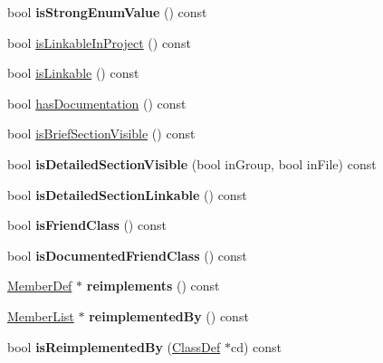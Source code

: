 \begin{DoxyCompactItemize}
\item 
\hypertarget{class_member_def_af5e60e030027845efcf00ce2d73c0cb7}{bool {\bfseries is\-Strong\-Enum\-Value} () const }\label{class_member_def_af5e60e030027845efcf00ce2d73c0cb7}

\item 
bool \hyperlink{class_member_def_a7ff00a84da6e47f3c64c6bf9f6316385}{is\-Linkable\-In\-Project} () const 
\item 
bool \hyperlink{class_member_def_afb5645c0dc69c2f1da67da6e33316e3b}{is\-Linkable} () const 
\item 
bool \hyperlink{class_member_def_a585dcd381ab70014568db8ad457fc8b1}{has\-Documentation} () const 
\item 
bool \hyperlink{class_member_def_adbe69a2ff48ebe408bf56d8f01509942}{is\-Brief\-Section\-Visible} () const 
\item 
\hypertarget{class_member_def_ad7baff8b9ee4a2857d147d23a2c89c86}{bool {\bfseries is\-Detailed\-Section\-Visible} (bool in\-Group, bool in\-File) const }\label{class_member_def_ad7baff8b9ee4a2857d147d23a2c89c86}

\item 
\hypertarget{class_member_def_a0babea827533bcaf56f976fc59504bf9}{bool {\bfseries is\-Detailed\-Section\-Linkable} () const }\label{class_member_def_a0babea827533bcaf56f976fc59504bf9}

\item 
\hypertarget{class_member_def_a113cd56379fd1fcc70708f95e2ffbb73}{bool {\bfseries is\-Friend\-Class} () const }\label{class_member_def_a113cd56379fd1fcc70708f95e2ffbb73}

\item 
\hypertarget{class_member_def_a41bb618437fe812c4258089f4e1389b9}{bool {\bfseries is\-Documented\-Friend\-Class} () const }\label{class_member_def_a41bb618437fe812c4258089f4e1389b9}

\item 
\hypertarget{class_member_def_a5ad3b0daf1ded995a41ed34bcc96ba2f}{\hyperlink{class_member_def}{Member\-Def} $\ast$ {\bfseries reimplements} () const }\label{class_member_def_a5ad3b0daf1ded995a41ed34bcc96ba2f}

\item 
\hypertarget{class_member_def_a0ef5b2b4e78a6184a2f1dd49883088cb}{\hyperlink{class_member_list}{Member\-List} $\ast$ {\bfseries reimplemented\-By} () const }\label{class_member_def_a0ef5b2b4e78a6184a2f1dd49883088cb}

\item 
\hypertarget{class_member_def_a6b607d110ab1b2cb0e2f49a8889ac36c}{bool {\bfseries is\-Reimplemented\-By} (\hyperlink{class_class_def}{Class\-Def} $\ast$cd) const }\label{class_member_def_a6b607d110ab1b2cb0e2f49a8889ac36c}


\end{DoxyCompactItemize}
